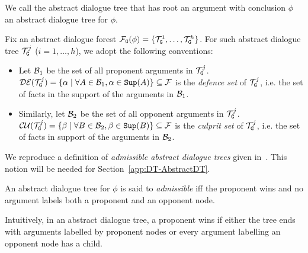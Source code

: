 \begin{remark} We call the abstract dialogue tree that has root an argument with conclusion $\phi$ an abstract dialogue tree for $\phi$.
\end{remark}






 Fix an abstract dialogue forest $\mathcal{F}_{\texttt{\textup{G}}}(\phi)  =  \{\mathcal{T}^{1}_{\texttt{\textup{G}}}, \ldots, \mathcal{T}^{h}_{\texttt{\textup{G}}}\}$. For such abstract dialogue tree $\mathcal{T}^{j}_ {\texttt{\textup{G}}}$ ($i = 1 , \ldots, h$), we adopt the following conventions:
\begin{itemize}
    \item Let $\mathcal{B}_1$ be the set of all proponent arguments in $\mathcal{T}^{j}_{\texttt{\textup{G}}}$. $\mathcal{DE}(\mathcal{T}^{j}_{\texttt{\textup{G}}}) = \{\alpha \mid  \forall A \in \mathcal{B}_1, \alpha \in \texttt{\textup{Sup}}(A) \} \subseteq \mathcal{F}$ is the \emph{defence set} of $\mathcal{T}^{j}_{\texttt{\textup{G}}}$, i.e. the set of facts in the support of the arguments in $\mathcal{B}_1$.
   
    \item Similarly, let $\mathcal{B}_2$ be the set of all opponent arguments in $\mathcal{T}^{j}_{\texttt{\textup{G}}}$. $\mathcal{CU}(\mathcal{T}^{j}_{\texttt{\textup{G}}}) = \{\beta \mid  \forall B \in \mathcal{B}_2, \beta \in \texttt{\textup{Sup}}(B) \} \subseteq \mathcal{F}$ is the \emph{culprit set} of $\mathcal{T}^{j}_{\texttt{\textup{G}}}$, i.e. the set of facts in support of the arguments in $\mathcal{B}_2$. 



\end{itemize}

 We reproduce a definition of \emph{admissible abstract dialogue trees} given in~\cite{loanho_2024}. This notion will be needed for Section~\ref{app:DT-AbstractDT}.

\begin{definition} 
\label{def:adm-ab-dt}
An abstract dialogue tree for $\phi$ is said to \emph{admissible} iff the proponent wins and no argument labels both a proponent and an opponent node. 
\end{definition}

Intuitively, in an abstract dialogue tree, a proponent wins if either the tree ends with arguments labelled by proponent nodes or every argument labelling an opponent node has a child.









